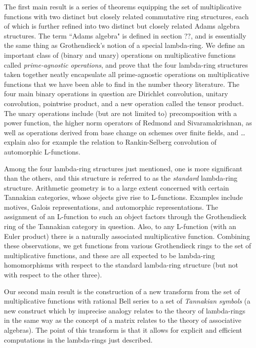 \documentclass[a4paper]{article}
\begin{document}
The first main result is a series of theorems equipping the set of multiplicative functions with two distinct but closely related commutative ring structures, each of which is further refined into two distinct but closely related Adams algebra structures. The term ``Adams algebra" is defined in section ??, and is essentially the same thing as Grothendieck's notion of a special lambda-ring. We define an important class of (binary and unary) operations on multiplicative functions called \emph{prime-agnostic operations}, and prove that the four lambda-ring structures taken together neatly encapsulate all prime-agnostic operations on multiplicative functions that we have been able to find in the number theory literature. The four main binary operations in question are Dirichlet convolution, unitary convolution, pointwise product, and a new operation called the tensor product. The unary operations include (but are not limited to) precomposition with a power function, the higher norm operators of Redmond and Sivaramakrishnan, as well as operations derived from base change on schemes over finite fields, and \ldots explain also for example the relation to Rankin-Selberg convolution of automorphic L-functions.

Among the four lambda-ring structures just mentioned, one is more significant than the others, and this structure is referred to as the \emph{standard} lambda-ring structure. Arithmetic geometry is to a large extent concerned with certain Tannakian categories, whose objects give rise to L-functions. Examples include motives, Galois representations, and automorphic representations. The assignment of an L-function to such an object factors through the Grothendieck ring of the Tannakian category in question. Also, to any L-function (with an Euler product) there is a naturally associated multiplicative function. Combining these observations, we get functions from various Grothendieck rings to the set of multiplicative functions, and these are all expected to be lambda-ring homomorphisms with respect to the standard lambda-ring structure (but not with respect to the other three). 

Our second main result is the construction of a new transform from the set of multiplicative functions with rational Bell series to a set of \emph{Tannakian symbols} (a new construct which by imprecise analogy relates to the theory of lambda-rings in the same way as the concept of a matrix relates to the theory of associative algebras). The point of this transform is that it allows for explicit and efficient computations in the lambda-rings just described.
\end{document}
